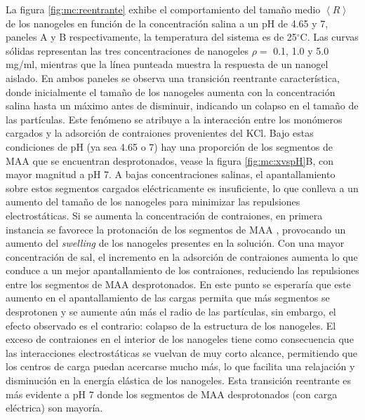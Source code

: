	La figura \ref{fig:mc:reentrante} exhibe el comportamiento del tama\~no medio $\left<R\right>$ de los nanogeles en funci\'on de la concentraci\'on salina a un pH de 4.65 y 7, paneles A y B respectivamente, la temperatura del sistema es de 25$^\circ$C. Las curvas s\'olidas representan las tres concentraciones de nanogeles $\rho =$ 0.1, 1.0 y 5.0 mg/ml, mientras que la l\'inea punteada muestra la respuesta de un nanogel aislado. En ambos paneles se observa una transici\'on reentrante caracter\'istica, donde inicialmente el tama\~no de los nanogeles aumenta con la concentraci\'on salina hasta un m\'aximo antes de disminuir, indicando un colapso en el tama\~no de las part\'iculas. Este fen\'omeno se atribuye a la interacci\'on entre los mon\'omeros cargados y la adsorci\'on de contraiones provenientes del KCl. Bajo estas condiciones de pH (ya sea 4.65 o 7) hay una proporci\'on de los segmentos de MAA que se encuentran desprotonados, vease la figura \ref{fig:mc:xvspH}B, con mayor magnitud a pH 7. A bajas concentraciones salinas, el apantallamiento sobre estos segmentos cargados el\'ectricamente es insuficiente, lo que conlleva a un aumento del tama\~no de los nanogeles para minimizar las repulsiones electrost\'aticas. Si se aumenta la concentraci\'on de contraiones, en primera instancia se favorece la protonaci\'on de los segmentos de MAA \cite{perez2021thermodynamic}, provocando un aumento del \textit{swelling} de los nanogeles presentes en la soluci\'on. Con una mayor concentraci\'on de sal, el incremento en la adsorci\'on de contraiones aumenta lo que conduce a un mejor apantallamiento de los contraiones, reduciendo las repulsiones entre los segmentos de MAA desprotonados. En este punto se esperar\'ia que este aumento en el apantallamiento de las cargas permita que m\'as segmentos se desprotonen y se aumente a\'un m\'as el radio de las part\'iculas, sin embargo, el efecto observado es el contrario: colapso de la estructura de los nanogeles. El exceso de contraiones en el interior de los nanogeles tiene como consecuencia que las interacciones electrost\'aticas se vuelvan de muy corto alcance, permitiendo que los centros de carga puedan acercarse mucho m\'as, lo que facilita una relajaci\'on y disminuci\'on en la energ\'ia el\'astica de los nanogeles. Esta transici\'on reentrante es m\'as evidente a pH 7 donde los segmentos de MAA desprotonados (con carga el\'ectrica) son mayor\'ia.
	
